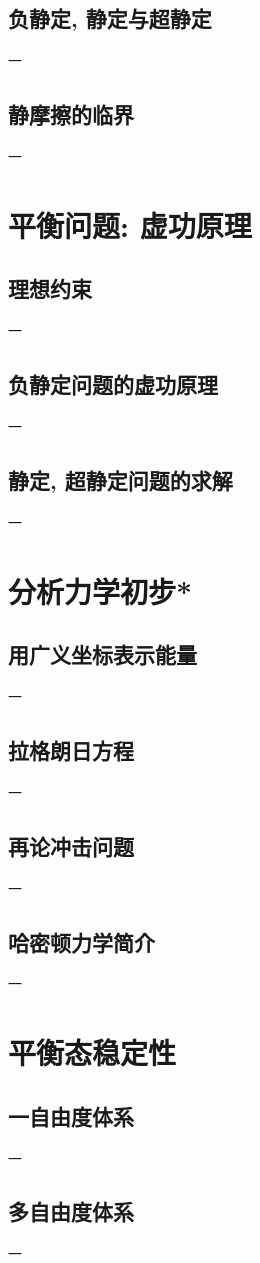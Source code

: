 \subsection{负静定,  静定与超静定}

一

\subsection{静摩擦的临界}

一

\section{平衡问题:  虚功原理}

\subsection{理想约束}

一

\subsection{负静定问题的虚功原理}

一

\subsection{静定,  超静定问题的求解}

一

\section{分析力学初步*}

\subsection{用广义坐标表示能量}

一

\subsection{拉格朗日方程}

一

\subsection{再论冲击问题}

一

\subsection{哈密顿力学简介}

一

\section{平衡态稳定性}

\subsection{一自由度体系}

一

\subsection{多自由度体系}

一
